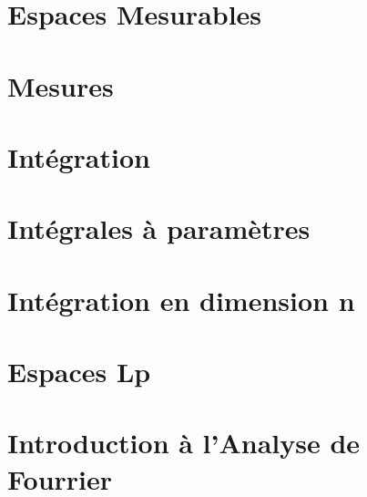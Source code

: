 


\chapter{Espaces Mesurables}


\chapter{Mesures}


\chapter{Intégration}


\chapter{Intégrales à paramètres}


\chapter{Intégration en dimension n}


\chapter{Espaces Lp}


\chapter{Introduction à l'Analyse de Fourrier}

